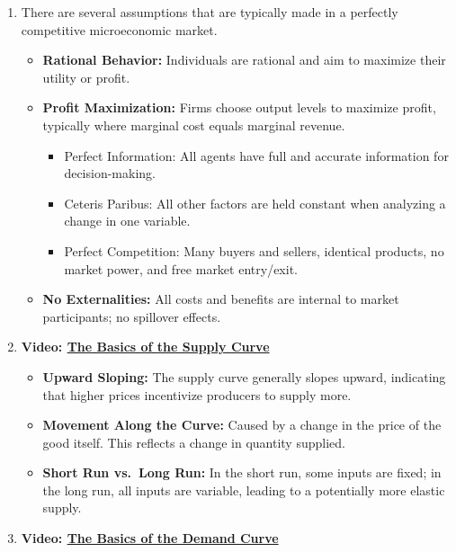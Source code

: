 \documentclass[
]{book}
\providecommand{\tightlist}{%
  \setlength{\itemsep}{0pt}\setlength{\parskip}{0pt}}
\begin{document}
\begin{enumerate}
\def\labelenumi{\arabic{enumi}.}
\tightlist
\item
  There are several assumptions that are typically made in a perfectly competitive microeconomic market.

  \begin{itemize}
  \tightlist
  \item
    \textbf{Rational Behavior:} Individuals are rational and aim to maximize their utility or profit.
  \item
    \textbf{Profit Maximization:} Firms choose output levels to maximize profit, typically where marginal cost equals marginal revenue.

    \begin{itemize}
    \tightlist
    \item
      Perfect Information: All agents have full and accurate information for decision-making.
    \item
      Ceteris Paribus: All other factors are held constant when analyzing a change in one variable.
    \item
      Perfect Competition: Many buyers and sellers, identical products, no market power, and free market entry/exit.\\
    \end{itemize}
  \item
    \textbf{No Externalities:} All costs and benefits are internal to market participants; no spillover effects.
  \end{itemize}
\item
  \textbf{Video: \href{https://www.youtube.com/watch?v=nKvrbOq1OfI&list=PL-uRhZ_p-BM49QD09RNNJItpiiMGP4GUI&index=2}{The Basics of the Supply Curve}}

  \begin{itemize}
  \tightlist
  \item
    \textbf{Upward Sloping:} The supply curve generally slopes upward, indicating that higher prices incentivize producers to supply more.
  \item
    \textbf{Movement Along the Curve:} Caused by a change in the price of the good itself. This reflects a change in quantity supplied.
  \item
    \textbf{Short Run vs.~Long Run:} In the short run, some inputs are fixed; in the long run, all inputs are variable, leading to a potentially more elastic supply.
  \end{itemize}
\item
  \textbf{Video: \href{https://www.youtube.com/watch?v=kUPm2tMCbGE&list=PL-uRhZ_p-BM49QD09RNNJItpiiMGP4GUI}{The Basics of the Demand Curve}}


\end{enumerate}
\end{document}
